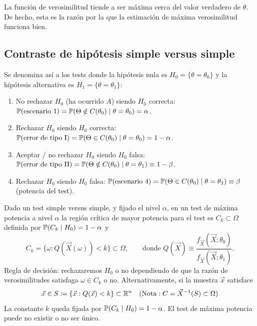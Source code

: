 La función de verosimilitud tiende a ser máxima cerca del valor verdadero de $\theta$. De hecho, esta es la razón por la que la estimación de máxima verosimilitud funciona bien.

\subsection{Contraste de hipótesis simple versus simple}

Se denomina así a los tests donde la hipótesis nula es $H_0 = \{\theta = \theta_0\}$ y la hipótesis alternativa es $H_1 = \{\theta = \theta_1\}$:
\begin{enumerate}
  \item No rechazar $H_0$ (ha ocurrido $A$) siendo $H_0$ correcta: $\mathbb{P}(\text{escenario 1}) = \mathbb{P}(\Theta \notin C(\theta_0) \mid \theta = \theta_0) = \alpha$.
  \item Rechazar $H_0$ siendo $H_0$ correcta: $\mathbb{P}(\text{error de tipo I}) = \mathbb{P}(\Theta \in C(\theta_0) \mid \theta = \theta_0) = 1 - \alpha$.
  \item Aceptar / no rechazar $H_0$ siendo $H_0$ falsa: $\mathbb{P}(\text{error de tipo II}) = \mathbb{P}(\Theta \notin C(\theta_0) \mid \theta = \theta_1) \equiv 1 - \beta$.
  \item Rechazar $H_0$ siendo $H_0$ falsa: $\mathbb{P}(\text{escenario 4}) = \mathbb{P}(\Theta \in C(\theta_0) \mid \theta = \theta_1) \equiv \beta$ (potencia del test).
\end{enumerate}

\begin{teorema}
Dado un test simple versus simple, y fijado el nivel $\alpha$, en un test de máxima potencia a nivel $\alpha$ la región crítica de mayor potencia para el test es $C_k \subset \Omega$ definida por $\mathbb{P}(C_k \mid H_0) = 1 - \alpha$ y
\[
  C_k = \bigl\{\omega : Q(\vec{X}(\omega)) < k\bigr\} \subset \Omega, \qquad \text{donde } Q(\vec{X}) \equiv \frac{f_{\vec{X}}(\vec{X}; \theta_0)}{f_{\vec{X}}(\vec{X}; \theta_1)}.
\]
Regla de decisión: rechazaremos $H_0$ o no dependiendo de que la razón de verosimilitudes satisfaga $\omega \in C_k$ o no. Alternativamente, si la muestra $\vec{x}$ satisface $$\vec{x} \in S \coloneqq \{\vec{x} : Q(\vec{x}) < k\} \subset \mathbb{R}^n \quad (\text{Nota}: C = \vec{X}^{-1}(S) \subset \Omega)$$
La constante $k$ queda fijada por $\mathbb{P}(C_k \mid H_0) = 1 - \alpha$. El test de máxima potencia puede no existir o no ser único.
\end{teorema}

